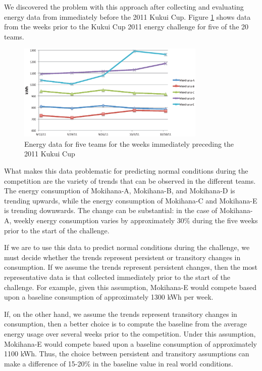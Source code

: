 \documentclass[jou]{apa} %
\begin{document}
We discovered the problem with this approach after collecting and evaluating energy data
from immediately before the 2011 Kukui Cup. Figure
\ref{fig:kukuicup-baseline-data-chart} shows data from the weeks prior to the
Kukui Cup 2011 energy challenge for five of the 20 teams.

\begin{figure}[htbp]
\begin{center}
\includegraphics[width=0.8\textwidth]{kc-baselines.3.eps}
\caption{Energy data for five teams for the weeks immediately preceding the 2011 Kukui Cup}
\label{fig:kukuicup-baseline-data-chart}
\end{center}
\end{figure}


What makes this data problematic for predicting normal conditions during the
competition are the variety of trends that can be observed in the different teams.  The
energy consumption of Mokihana-A, Mokihana-B, and Mokihana-D is trending upwards, while
the energy consumption of Mokihana-C and Mokihana-E is trending downwards.  The change can
be substantial: in the case of Mokihana-A, weekly energy consumption varies by
approximately 30\% during the five weeks prior to the start of the challenge.

If we are to use this data to predict normal conditions during the challenge, we must
decide whether the trends represent persistent or transitory changes in consumption.  If
we assume the trends represent persistent changes, then the most representative data is
that collected immediately prior to the start of the challenge.  For example, given this
assumption, Mokihana-E would compete based upon a baseline consumption of approximately 1300
kWh per week.

If, on the other hand, we assume the trends represent transitory changes in consumption,
then a better choice is to compute the baseline from the average energy usage over several
weeks prior to the competition.  Under this assumption, Mokihana-E would compete based
upon a baseline consumption of approximately 1100 kWh.  Thus, the choice between
persistent and transitory assumptions can make a difference of 15-20\% in the baseline value
in real world conditions.
\end{document}
